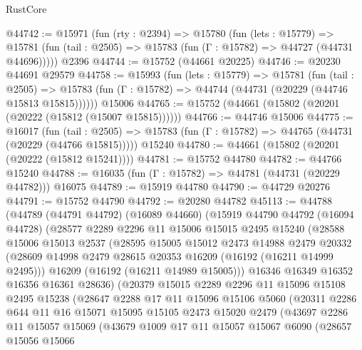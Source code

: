 \begin{lexlean}{RustCore}
\begin{coremodule}
@44742 := @15971
    (fun (rty : @2394) =>
    @15780
      (fun (lets : @15779) =>
      @15781 (fun (tail : @2505) => @15783 (fun (Γ : @15782) => @44727 (@44731 @44696)))))
    @2396
@44744 := @15752 (@44661 @20225)
@44746 := @20230 @44691 @29579
@44758 := @15993
    (fun (lets : @15779) =>
    @15781
      (fun (tail : @2505) =>
      @15783 (fun (Γ : @15782) => @44744 (@44731 (@20229 (@44746 @15813 @15815))))))
    @15006
@44765 := @15752 (@44661 (@15802 (@20201 (@20222 (@15812 (@15007 @15815))))))
@44766 := @44746 @15006
@44775 := @16017
    (fun (tail : @2505) => @15783 (fun (Γ : @15782) => @44765 (@44731 (@20229 (@44766 @15815)))))
    @15240
@44780 := @44661 (@15802 (@20201 (@20222 (@15812 @15241))))
@44781 := @15752 @44780
@44782 := @44766 @15240
@44788 := @16035 (fun (Γ : @15782) => @44781 (@44731 (@20229 @44782))) @16075
@44789 := @15919 @44780
@44790 := @44729 @20276
@44791 := @15752 @44790
@44792 := @20280 @44782
@45113 := @44788
    (@44789
      (@44791 @44792)
      (@16089 @44660)
      (@15919
        @44790
        @44792
        (@16094 @44728)
        (@28577
          @2289
          @2296
          @11
          @15006
          @15015
          @2495
          @15240
          (@28588
            @15006
            @15013
            @2537
            (@28595
              @15005
              @15012
              @2473
              @14988
              @2479
              @20332
              (@28609 @14998 @2479 @28615 @20353 @16209 (@16192 (@16211 @14999 @2495)))
              @16209
              (@16192 (@16211 @14989 @15005)))
            @16346
            @16349
            @16352
            @16356
            @16361
            @28636)
          (@20379
            @15015
            @2289
            @2296
            @11
            @15096
            @15108
            @2495
            @15238
            (@28647
              @2288
              @17
              @11
              @15096
              @15106
              @5060
              (@20311
                @2286
                @644
                @11
                @16
                @15071
                @15095
                @15105
                @2473
                @15020
                @2479
                (@43697
                  @2286
                  @11
                  @15057
                  @15069
                  (@43679
                    @1009
                    @17
                    @11
                    @15057
                    @15067
                    @6090
                    (@28657
                      @15056
                      @15066

\end{coremodule}
\end{lexlean}
